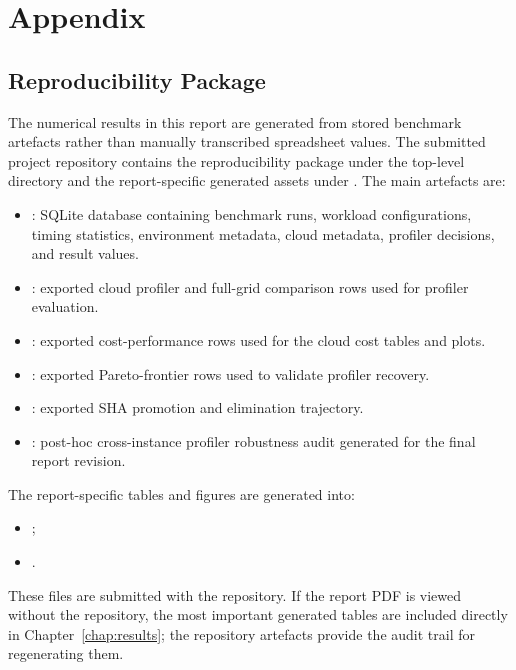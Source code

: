 \chapter{Appendix}

\section{Reproducibility Package}

The numerical results in this report are generated from stored benchmark
artefacts rather than manually transcribed spreadsheet values. The submitted
project repository contains the reproducibility package under the top-level
 directory and the report-specific generated assets under
. The main artefacts are:

\begin{itemize}
    \item {}: SQLite database containing benchmark
    runs, workload configurations, timing statistics, environment metadata,
    cloud metadata, profiler decisions, and result values.
    \item {}: exported cloud profiler and
    full-grid comparison rows used for profiler evaluation.
    \item {}: exported cost-performance
    rows used for the cloud cost tables and plots.
    \item {}: exported Pareto-frontier rows
    used to validate profiler recovery.
    \item {}: exported SHA promotion and
    elimination trajectory.
    \item {}: post-hoc cross-instance
    profiler robustness audit generated for the final report revision.
\end{itemize}

The report-specific tables and figures are generated into:

\begin{itemize}
    \item {};
    \item {}.
\end{itemize}

These files are submitted with the repository. If the report PDF is viewed
without the repository, the most important generated tables are included
directly in Chapter~\ref{chap:results}; the repository artefacts provide the
audit trail for regenerating them.


